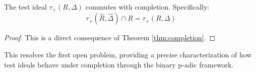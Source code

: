 \begin{corollary}\label{cor:completion-solution}
The test ideal $\tau_+(R,\Delta)$ commutes with completion. Specifically:
$$\tau_+(\hat{R},\hat{\Delta}) \cap R = \tau_+(R,\Delta)$$
\end{corollary}

\begin{proof}
This is a direct consequence of Theorem \ref{thm:completion}.
\end{proof}

This resolves the first open problem, providing a precise characterization of how test ideals behave under completion through the binary p-adic framework. 
